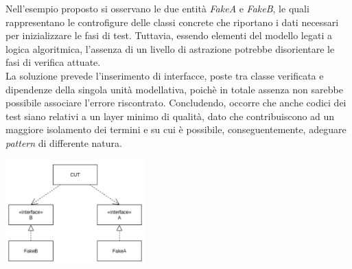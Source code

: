 \documentclass{article}
\begin{document}
Nell'esempio proposto si osservano le due entità \textit{FakeA} e \textit{FakeB}, le quali rappresentano le controfigure delle classi concrete che riportano i dati necessari per inizializzare le fasi di test. Tuttavia, essendo elementi del modello legati a logica algoritmica, l'assenza di un livello di astrazione potrebbe disorientare le fasi di verifica attuate.\vspace*{14pt}\\
La soluzione prevede l'inserimento di interfacce, poste tra classe verificata e dipendenze della singola unità modellativa, poichè in totale assenza non sarebbe possibile associare l'errore riscontrato. Concludendo, occorre che anche codici dei test siano relativi a un layer minimo di qualità, dato che contribuiscono ad un maggiore isolamento dei termini e su cui è possibile, conseguentemente, adeguare \textit{pattern} di differente natura.
\begin{center}
    \includegraphics[width=0.4\textwidth]{foto 3.png}
\end{center} 
\end{document}
